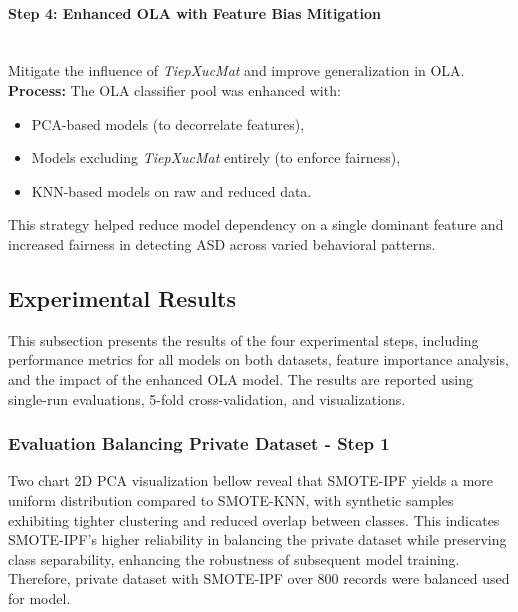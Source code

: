 \documentclass[conference]{IEEEtran}
\begin{document}
\paragraph{\textbf{Step 4: Enhanced OLA with Feature Bias Mitigation}}\\

Mitigate the influence of \textit{TiepXucMat} and improve generalization in OLA.\\
\textbf{Process:} The OLA classifier pool was enhanced with:
\begin{itemize}
\item PCA-based models (to decorrelate features),
\item Models excluding \textit{TiepXucMat} entirely (to enforce fairness),
\item KNN-based models on raw and reduced data.
\end{itemize}
This strategy helped reduce model dependency on a single dominant feature and increased fairness in detecting ASD across varied behavioral patterns.
\subsection{Experimental Results}
This subsection presents the results of the four experimental steps, including performance metrics for all models on both datasets, feature importance analysis, and the impact of the enhanced OLA model. The results are reported using single-run evaluations, 5-fold cross-validation, and visualizations.

\subsubsection{Evaluation Balancing Private Dataset - Step 1}
Two chart 2D PCA visualization bellow reveal that SMOTE-IPF yields a more uniform distribution compared to SMOTE-KNN, with synthetic samples exhibiting tighter clustering and reduced overlap between classes. This indicates SMOTE-IPF’s higher reliability in balancing the private dataset while preserving class separability, enhancing the robustness of subsequent model training.\\
Therefore, private dataset with SMOTE-IPF over 800 records were balanced used for model.
\end{document}
